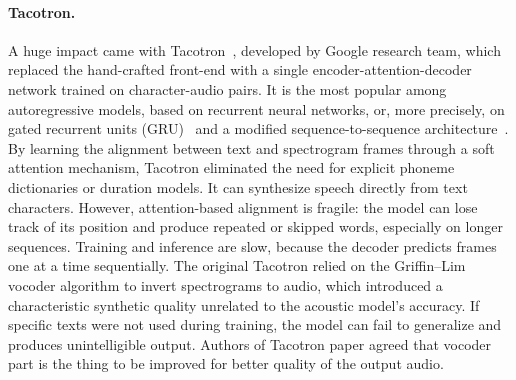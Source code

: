 \documentclass[
         english, %
    monochrome, %
]{VUMIFSEMasterThesis}
\begin{document}
\paragraph{Tacotron.}
A huge impact came with Tacotron~\cite{wang2017tacotron}, developed by Google research team, which replaced the hand-crafted front-end with a single encoder-attention-decoder network trained on character-audio pairs.
It is the most popular among autoregressive models, based on recurrent neural networks, or, more precisely, on gated recurrent units (GRU)~\cite{cho2014learning} and a modified sequence-to-sequence architecture~\cite{sutskever2014sequence}.
By learning the alignment between text and spectrogram frames through a soft attention mechanism, Tacotron eliminated the need for explicit phoneme dictionaries or duration models.
It can synthesize speech directly from text characters.
However, attention-based alignment is fragile: the model can lose track of its position and produce repeated or skipped words, especially on longer sequences.
Training and inference are slow, because the decoder predicts frames one at a time sequentially.
The original Tacotron relied on the Griffin--Lim vocoder algorithm to invert spectrograms to audio, which introduced a characteristic synthetic quality unrelated to the acoustic model's accuracy.
If specific texts were not used during training, the model can fail to generalize and produces unintelligible output.
Authors of Tacotron paper agreed that vocoder part is the thing to be improved for better quality of the output audio.
\end{document}
